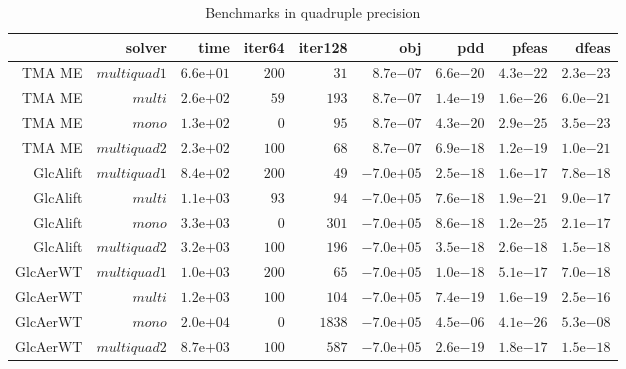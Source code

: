 \documentclass[varwidth=20cm,crop=true]{standalone}
\begin{document}
\begin{table}
  \caption{Benchmarks in quadruple precision}
  \begin{tabular}{rrrrrrrrr}
    \hline\hline
     & \textbf{solver} & \textbf{time} & \textbf{iter64} & \textbf{iter128} & \textbf{obj} & \textbf{pdd} & \textbf{pfeas} & \textbf{dfeas} \\\hline
    TMA ME & \(multiquad1\) & \(6.6\)e\(+01\) & \(200\) & \(31\) & \(8.7\)e\(-07\) & \(6.6\)e\(-20\) & \(4.3\)e\(-22\) & \(2.3\)e\(-23\) \\
    TMA ME & \(multi\) & \(2.6\)e\(+02\) & \(59\) & \(193\) & \(8.7\)e\(-07\) & \(1.4\)e\(-19\) & \(1.6\)e\(-26\) & \(6.0\)e\(-21\) \\
    TMA ME & \(mono\) & \(1.3\)e\(+02\) & \(0\) & \(95\) & \(8.7\)e\(-07\) & \(4.3\)e\(-20\) & \(2.9\)e\(-25\) & \(3.5\)e\(-23\) \\
    TMA ME & \(multiquad2\) & \(2.3\)e\(+02\) & \(100\) & \(68\) & \(8.7\)e\(-07\) & \(6.9\)e\(-18\) & \(1.2\)e\(-19\) & \(1.0\)e\(-21\) \\\hline
    GlcAlift & \(multiquad1\) & \(8.4\)e\(+02\) & \(200\) & \(49\) & \(-7.0\)e\(+05\) & \(2.5\)e\(-18\) & \(1.6\)e\(-17\) & \(7.8\)e\(-18\) \\
    GlcAlift & \(multi\) & \(1.1\)e\(+03\) & \(93\) & \(94\) & \(-7.0\)e\(+05\) & \(7.6\)e\(-18\) & \(1.9\)e\(-21\) & \(9.0\)e\(-17\) \\
    GlcAlift & \(mono\) & \(3.3\)e\(+03\) & \(0\) & \(301\) & \(-7.0\)e\(+05\) & \(8.6\)e\(-18\) & \(1.2\)e\(-25\) & \(2.1\)e\(-17\) \\
    GlcAlift & \(multiquad2\) & \(3.2\)e\(+03\) & \(100\) & \(196\) & \(-7.0\)e\(+05\) & \(3.5\)e\(-18\) & \(2.6\)e\(-18\) & \(1.5\)e\(-18\) \\\hline
    GlcAerWT & \(multiquad1\) & \(1.0\)e\(+03\) & \(200\) & \(65\) & \(-7.0\)e\(+05\) & \(1.0\)e\(-18\) & \(5.1\)e\(-17\) & \(7.0\)e\(-18\) \\
    GlcAerWT & \(multi\) & \(1.2\)e\(+03\) & \(100\) & \(104\) & \(-7.0\)e\(+05\) & \(7.4\)e\(-19\) & \(1.6\)e\(-19\) & \(2.5\)e\(-16\) \\
    GlcAerWT & \(mono\) & \(2.0\)e\(+04\) & \(0\) & \(1838\) & \(-7.0\)e\(+05\) & \(4.5\)e\(-06\) & \(4.1\)e\(-26\) & \(5.3\)e\(-08\) \\
    GlcAerWT & \(multiquad2\) & \(8.7\)e\(+03\) & \(100\) & \(587\) & \(-7.0\)e\(+05\) & \(2.6\)e\(-19\) & \(1.8\)e\(-17\) & \(1.5\)e\(-18\) \\\hline\hline
  \end{tabular}
\end{table}
\end{document}
